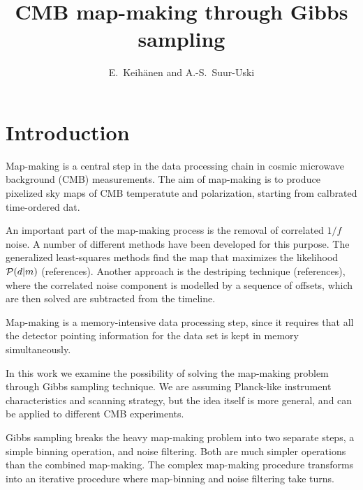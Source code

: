 \documentclass[traditabstract]{aa}
\begin{document}
\title{CMB map-making through Gibbs sampling}

\author
{E.~Keih\"anen and
A.-S.~Suur-Uski }



\abstract{
}


\maketitle

\section{Introduction}

Map-making is a central step in the data processing chain
in cosmic microwave background (CMB) measurements.
The aim of map-making is to produce pixelized sky maps 
of CMB temperatute and polarization, starting
from calbrated time-ordered dat.

An important part of the map-making process
is the removal of correlated $1/f$ noise.
A number of different methods have been developed for this purpose.
The generalized least-squares methods find the map
that maximizes the likelihood ${\cal P}(d | m)$ (references).
Another approach is the destriping technique (references),
where the correlated noise component is modelled by a sequence 
of offsets, which are then solved are subtracted from the timeline.

Map-making is a memory-intensive data processing step,
since it requires that all the detector pointing information
for the data set is kept in memory simultaneously.

In this work we examine the possibility of solving the map-making problem
through Gibbs sampling technique.
We are assuming Planck-like instrument characteristics and scanning strategy,
but the idea itself is more general, and can be applied to different CMB experiments.

Gibbs sampling breaks the heavy map-making problem into two separate steps,
a simple binning operation, and noise filtering.
Both are much simpler operations than the combined map-making.
The complex map-making procedure transforms
into an iterative procedure where map-binning and noise filtering take turns.
\end{document}
